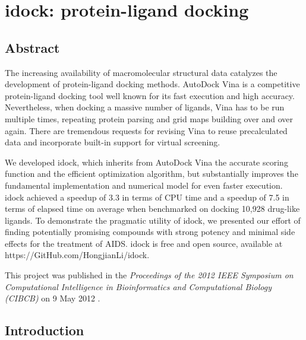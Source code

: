\chapter{idock: protein-ligand docking}

\section{Abstract}

The increasing availability of macromolecular structural data catalyzes the development of protein-ligand docking methods. AutoDock Vina is a competitive protein-ligand docking tool well known for its fast execution and high accuracy. Nevertheless, when docking a massive number of ligands, Vina has to be run multiple times, repeating protein parsing and grid maps building over and over again. There are tremendous requests for revising Vina to reuse precalculated data and incorporate built-in support for virtual screening.

We developed idock, which inherits from AutoDock Vina the accurate scoring function and the efficient optimization algorithm, but substantially improves the fundamental implementation and numerical model for even faster execution. idock achieved a speedup of 3.3 in terms of CPU time and a speedup of 7.5 in terms of elapsed time on average when benchmarked on docking 10,928 drug-like ligands. To demonstrate the pragmatic utility of idock, we presented our effort of finding potentially promising compounds with strong potency and minimal side effects for the treatment of AIDS. idock is free and open source, available at https://GitHub.com/HongjianLi/idock.

This project was published in the \textit{Proceedings of the 2012 IEEE Symposium on Computational Intelligence in Bioinformatics and Computational Biology (CIBCB)} on 9 May 2012 \citep{1153}.

\section{Introduction}

